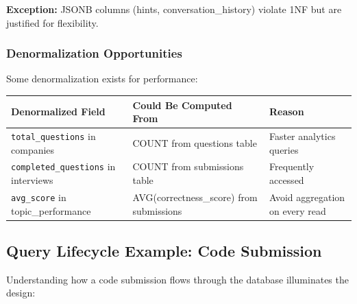 \documentclass[12pt,a4paper,oneside]{article}
\newcommand{\varname}[1]{\texttt{#1}}
\begin{document}
\textbf{Exception:} JSONB columns (hints, conversation\_history) violate 1NF but are justified for flexibility.

\subsubsection{Denormalization Opportunities}

Some denormalization exists for performance:

\begin{table}[H]
\centering
\begin{tabular}{|p{3cm}|p{8cm}|p{3cm}|}
\hline
\textbf{Denormalized Field} & \textbf{Could Be Computed From} & \textbf{Reason} \\
\hline
\varname{total\_questions} in companies & COUNT from questions table & Faster analytics queries \\
\hline
\varname{completed\_questions} in interviews & COUNT from submissions table & Frequently accessed \\
\hline
\varname{avg\_score} in topic\_performance & AVG(correctness\_score) from submissions & Avoid aggregation on every read \\
\hline
\end{tabular}
\end{table}

\subsection{Query Lifecycle Example: Code Submission}

Understanding how a code submission flows through the database illuminates the design:
\end{document}
